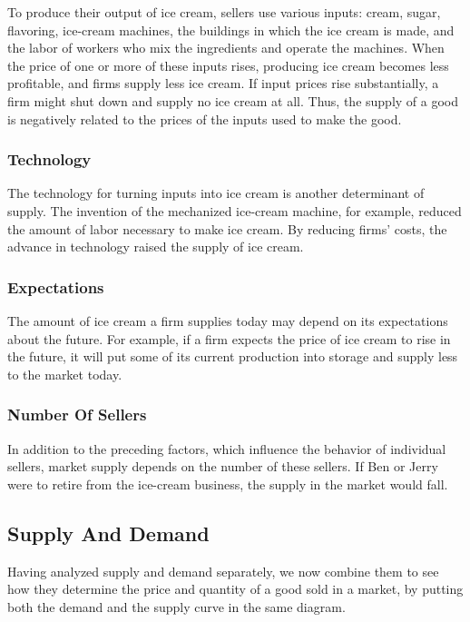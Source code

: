 To produce their output of ice cream, sellers use various inputs: cream, sugar, flavoring, ice-cream machines, the
buildings in which the ice cream is made, and the labor of workers who mix the ingredients and operate the machines.
When the price of one or more of these inputs rises, producing ice cream becomes less profitable, and firms supply
less ice cream. If input prices rise substantially, a firm might shut down and supply no ice cream at all. Thus, the
supply of a good is negatively related to the prices of the inputs used to make the good.

\subsubsection*{Technology}

The technology for turning inputs into ice cream is another determinant of supply. The invention of the mechanized
ice-cream machine, for example, reduced the amount of labor necessary to make ice cream. By reducing firms' costs,
the advance in technology raised the supply of ice cream.

\subsubsection*{Expectations}

The amount of ice cream a firm supplies today may depend on its expectations about the future. For example, if a firm
expects the price of ice cream to rise in the future, it will put some of its current production into storage and
supply less to the market today.

\subsubsection*{Number Of Sellers}

In addition to the preceding factors, which influence the behavior of individual sellers, market supply depends on
the number of these sellers. If Ben or Jerry were to retire from the ice-cream business, the supply in the market
would fall.

\subsection{Supply And Demand}

Having analyzed supply and demand separately, we now combine them to see how they determine the price and quantity of
a good sold in a market, by putting both the demand and the supply curve in the same diagram.

